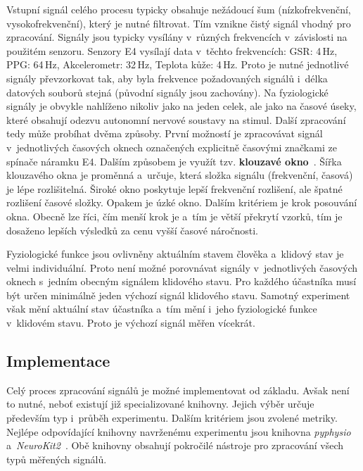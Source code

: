     Vstupní signál celého procesu typicky obsahuje nežádoucí šum (nízkofrekvenční, vysokofrekvenční), který je nutné filtrovat. Tím vznikne čistý signál vhodný pro zpracování. Signály jsou typicky vysílány v~různých frekvencích v~závislosti na použitém senzoru. Senzory E4 vysílají data v~těchto frekvencích: GSR: 4\,Hz, PPG: 64\,Hz, Akcelerometr: 32\,Hz, Teplota kůže: 4\,Hz. Proto je nutné jednotlivé signály převzorkovat tak, aby byla frekvence požadovaných signálů i~délka datových souborů stejná (původní signály jsou zachovány). Na fyziologické signály je obvykle nahlíženo nikoliv jako na jeden celek, ale jako na časové úseky, které obsahují odezvu autonomní nervové soustavy na stimul. Další zpracování tedy může probíhat dvěma způsoby. První možností je zpracovávat signál v~jednotlivých časových oknech označených explicitně časovými značkami ze spínače náramku E4. Dalším způsobem je využít tzv. \textbf{klouzavé okno}~\cite{sliding_window}. Šířka klouzavého okna je proměnná a~určuje, která složka signálu (frekvenční, časová) je lépe rozlišitelná. Široké okno poskytuje lepší frekvenční rozlišení, ale špatné rozlišení časové složky. Opakem je úzké okno. Dalším kritériem je krok posouvání okna. Obecně lze říci, čím menší krok je a~tím je větší překrytí vzorků, tím je dosaženo lepších výsledků za cenu vyšší časové náročnosti. 
    
    Fyziologické funkce jsou ovlivněny aktuálním stavem člověka a~klidový stav je velmi individuální. Proto není možné porovnávat signály v~jednotlivých časových oknech s~jedním obecným signálem klidového stavu. Pro každého účastníka musí být určen minimálně jeden výchozí signál klidového stavu. Samotný experiment však mění aktuální stav účastníka a~tím mění i~jeho fyziologické funkce v~klidovém stavu. Proto je výchozí signál měřen vícekrát. 
    
    \subsection{Implementace}
    \label{navrh_implementace}
    Celý proces zpracování signálů je možné implementovat od základu. Avšak není to nutné, neboť existují již specializované knihovny. Jejich výběr určuje především typ i~průběh experimentu. Dalším kritériem jsou zvolené metriky. Nejlépe odpovídající knihovny navrženému experimentu jsou knihovna \emph{pyphysio}~\cite{pyphysio} a~\emph{NeuroKit2}~\cite{Makowski2021neurokit}. Obě knihovny obsahují pokročilé nástroje pro zpracování všech typů měřených signálů. 
    
